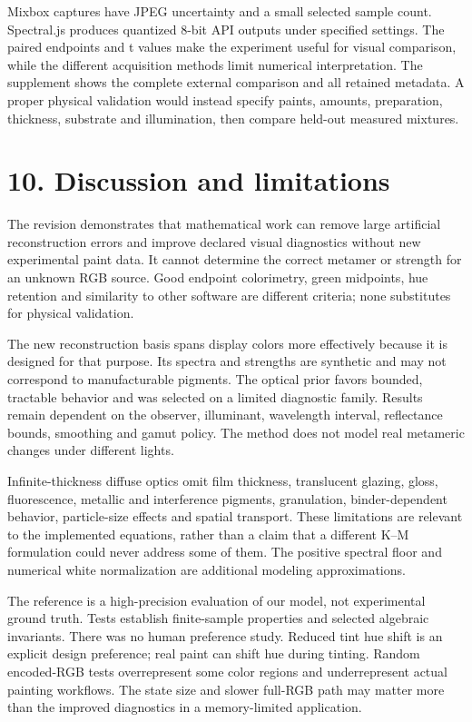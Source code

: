 \documentclass[
  10pt,
  twocolumn]{article}
\begin{document}
Mixbox captures have JPEG uncertainty and a small selected sample count.
Spectral.js produces quantized 8-bit API outputs under specified
settings. The paired endpoints and t values make the experiment useful
for visual comparison, while the different acquisition methods limit
numerical interpretation. The supplement shows the complete external
comparison and all retained metadata. A proper physical validation would
instead specify paints, amounts, preparation, thickness, substrate and
illumination, then compare held-out measured mixtures.

\hypertarget{discussion-and-limitations}{%
\section{10. Discussion and
limitations}\label{discussion-and-limitations}}

The revision demonstrates that mathematical work can remove large
artificial reconstruction errors and improve declared visual diagnostics
without new experimental paint data. It cannot determine the correct
metamer or strength for an unknown RGB source. Good endpoint
colorimetry, green midpoints, hue retention and similarity to other
software are different criteria; none substitutes for physical
validation.

The new reconstruction basis spans display colors more effectively
because it is designed for that purpose. Its spectra and strengths are
synthetic and may not correspond to manufacturable pigments. The optical
prior favors bounded, tractable behavior and was selected on a limited
diagnostic family. Results remain dependent on the observer, illuminant,
wavelength interval, reflectance bounds, smoothing and gamut policy. The
method does not model real metameric changes under different lights.

Infinite-thickness diffuse optics omit film thickness, translucent
glazing, gloss, fluorescence, metallic and interference pigments,
granulation, binder-dependent behavior, particle-size effects and
spatial transport. These limitations are relevant to the implemented
equations, rather than a claim that a different K--M formulation could
never address some of them. The positive spectral floor and numerical
white normalization are additional modeling approximations.

The reference is a high-precision evaluation of our model, not
experimental ground truth. Tests establish finite-sample properties and
selected algebraic invariants. There was no human preference study.
Reduced tint hue shift is an explicit design preference; real paint can
shift hue during tinting. Random encoded-RGB tests overrepresent some
color regions and underrepresent actual painting workflows. The state
size and slower full-RGB path may matter more than the improved
diagnostics in a memory-limited application.
\end{document}
